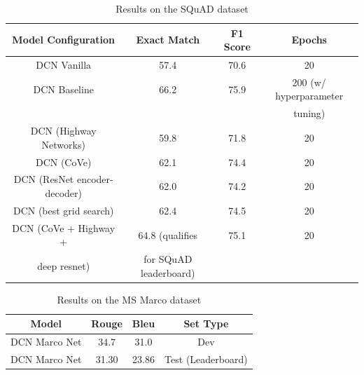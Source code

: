 


\begin{table}[t]
    \centering
    \begin{tabular}{|c|c|c|c|} \hline
    \textbf{Model Configuration} & \textbf{Exact Match} & \textbf{F1 Score} & \textbf{Epochs} \\
    \hline
     DCN Vanilla & 57.4 & 70.6 & 20 \\ 
     \hline
     DCN Baseline & 66.2 & 75.9 & 200 (w/ hyperparameter \\ 
      &  &  &  tuning) \\      \hline
     DCN (Highway Networks) & 59.8 & 71.8 & 20 \\ 
     \hline
     DCN (CoVe) & 62.1 & 74.4 & 20 \\ 
     \hline
     DCN (ResNet encoder-decoder) & 62.0 & 74.2 & 20 \\ 
     \hline
     DCN (best grid search) & 62.4 & 74.5 & 20 \\ 
     \hline
     DCN (CoVe + Highway + & 64.8 (qualifies & 75.1 & 20 \\ 
     deep resnet) & for SQuAD leaderboard) &  & \\ 
    \hline
    \end{tabular}
    \caption{Results on the SQuAD dataset}
    \label{tab:squad_res}
\end{table}

\begin{table}[t]
    \centering
    \begin{tabular}{|c|c|c|c|} \hline
    \textbf{Model} & \textbf{Rouge} & \textbf{Bleu} & \textbf{Set Type} \\
    \hline
     DCN Marco Net & 34.7 & 31.0 & Dev \\ 
     \hline
     DCN Marco Net & 31.30 & 23.86 & Test (Leaderboard) \\ 
    \hline
    \end{tabular}
    \caption{Results on the MS Marco dataset}
    \label{tab:squad_res}
\end{table}



